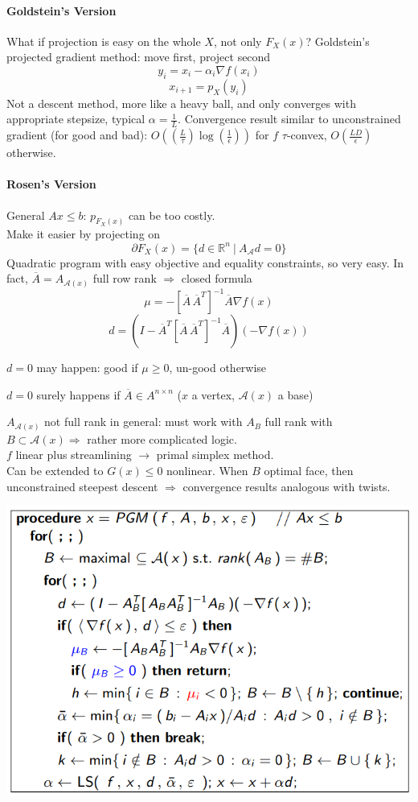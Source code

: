 \documentclass[10pt]{report}
\begin{document}
\paragraph{Goldstein's Version} What if projection is easy on the whole $X$, not only $F_X(x)$? Goldstein's projected gradient method: move first, project second $$y_i = x_i - \alpha_i\nabla f(x_i)$$ $$x_{i+1}= p_X(y_i)$$
Not a descent method, more like a heavy ball, and only converges with appropriate stepsize, typical $\alpha=\frac{1}{L}$. Convergence result similar to unconstrained gradient (for good and bad): $O\left(\left(\frac{L}{\tau}\right)\log\left(\frac{1}{\epsilon}\right)\right)$ for $f$ $\tau$-convex, $O\left(\frac{LD}{\epsilon}\right)$ otherwise.
\paragraph{Rosen's Version} General $Ax\leq b$: $p_{F_X(x)}$ can be too costly.\\
Make it easier by projecting on $$\partial F_X(x)=\{d\in \mathbb{R}^n\:|\:A_{\mathscr{A}}d=0\}$$ Quadratic program with easy objective and equality constraints, so very easy. In fact, $\overline{A}=A_{\mathscr{A}(x)}$ full row rank $\Rightarrow$ closed formula
$$\mu=-[\overline{A}\,\overline{A}^T]^{-1}\overline{A}\nabla f(x)$$
$$d = (I-\overline{A}^T[\overline{A}\,\overline{A}^T]^{-1}\overline{A})(-\nabla f(x))$$
	\begin{list}{}{}
		\item $d = 0$ may happen: good if $\mu \geq 0$, un-good otherwise
		\item $d = 0$ surely happens if $\overline{A}\in A^{n\times n}$ ($x$ a vertex, $\mathscr{A}(x)$ a base)
	\end{list}
$A_{\mathscr{A}(x)}$ not full rank in general: must work with $A_B$ full rank with $B\subset \mathscr{A}(x) \Rightarrow$ rather more complicated logic.\\
$f$ linear plus streamlining $\longrightarrow$ primal simplex method.\\
Can be extended to $G(x)\leq 0$ nonlinear. When $B$ optimal face, then unconstrained steepest descent $\Rightarrow$ convergence results analogous with twists.
\begin{center}
	\includegraphics[scale=0.75]{12.png}
\end{center}
\end{document}
